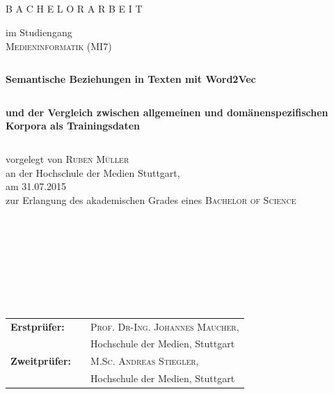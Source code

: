 \documentclass[12pt,a4paper]{report}
\begin{document}
\thispagestyle{empty}
\begin{verbatim}





\end{verbatim}

\begin{center}
\large B A C H E L O R A R B E I T


\end{center}
\begin{center}
im Studiengang\\
\textsc{Medieninformatik (MI7)}\\

\begin{verbatim}
\end{verbatim}

\textbf{\huge{Semantische Beziehungen in Texten mit Word2Vec }}\\
\begin{verbatim}
\end{verbatim}
\textbf{\large{und der Vergleich zwischen allgemeinen und domänenspezifischen Korpora als Trainingsdaten}}\\

\begin{verbatim}
\end{verbatim}
vorgelegt von \textsc{Ruben Müller}\\

an der Hochschule der Medien Stuttgart,\\

am 31.07.2015\\

zur Erlangung des akademischen Grades eines \textsc{Bachelor of Science}


\begin{verbatim}
\end{verbatim}


\end{center}
\begin{verbatim}







\end{verbatim}

\begin{flushleft}
\begin{tabular}{lll}
\textbf{Erstprüfer:} & & \textsc{Prof. Dr-Ing. Johannes Maucher},\\ 
&&\small Hochschule der Medien, Stuttgart  \\
\textbf{Zweitprüfer:} & & \textsc{M.Sc. Andreas Stiegler},\\
&&\small Hochschule der Medien, Stuttgart\\
\end{tabular}
\end{flushleft}
\end{document}
